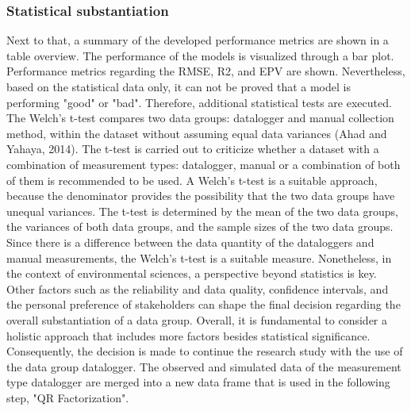 \subsubsection{Statistical substantiation}
Next to that, a summary of the developed performance metrics are shown in a table overview. The performance of the models is visualized through a bar plot. Performance metrics regarding the RMSE, R2, and EPV are shown. Nevertheless, based on the statistical data only, it can not be proved that a model is performing "good" or "bad". Therefore, additional statistical tests are executed. The Welch's t-test compares two data groups: datalogger and manual collection method, within the dataset without assuming equal data variances (Ahad and Yahaya, 2014).  The t-test is carried out to criticize whether a dataset with a combination of measurement types: datalogger, manual or a combination of both of them is recommended to be used. A Welch's t-test is a suitable approach, because the denominator provides the possibility that the two data groups have unequal variances. The t-test is determined by the mean of the two data groups, the variances of both data groups, and the sample sizes of the two data groups. Since there is a difference between the data quantity of the dataloggers and manual measurements, the Welch's t-test is a suitable measure. Nonetheless, in the context of environmental sciences, a perspective beyond statistics is key. Other factors such as the reliability and data quality, confidence intervals, and the personal preference of stakeholders can shape the final decision regarding the overall substantiation of a data group. Overall, it is fundamental to consider a holistic approach that includes more factors besides statistical significance. 
\newline
Consequently, the decision is made to continue the research study with the use of the data group datalogger. The observed and simulated data of the measurement type datalogger are merged into a new data frame that is used in the following step, "QR Factorization". 

